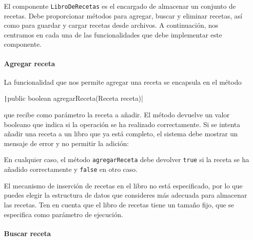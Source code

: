\documentclass[
    a4paper, %
    12pt, %
]{CSSullivanBusinessReport}
\begin{document}
El componente \texttt{LibroDeRecetas} es el encargado de almacenar un conjunto de recetas. Debe proporcionar métodos para agregar, buscar y eliminar recetas, así como para guardar y cargar recetas desde archivos. A continuación, nos centramos en cada una de las funcionalidades que debe implementar este componente.

\paragraph{Agregar receta}

La funcionalidad que nos permite agregar una receta se encapsula en el método

\texttt|public boolean agregarReceta(Receta receta)|

que recibe como parámetro la receta a añadir. El método devuelve un valor booleano que indica si la operación se ha realizado correctamente. Si se intenta añadir una receta a un libro que ya está completo, el sistema debe mostrar un mensaje de error y no permitir la adición:


En cualquier caso, el método \texttt{agregarReceta} debe devolver \texttt{true} si la receta se ha añadido correctamente y \texttt{false} en otro caso.

El mecanismo de inserción de recetas en el libro no está especificado, por lo que puedes elegir la estructura de datos que consideres más adecuada para almacenar las recetas. Ten en cuenta que el libro de recetas tiene un tamaño fijo, que se especifica como parámetro de ejecución.

\paragraph{Buscar receta}
\end{document}

